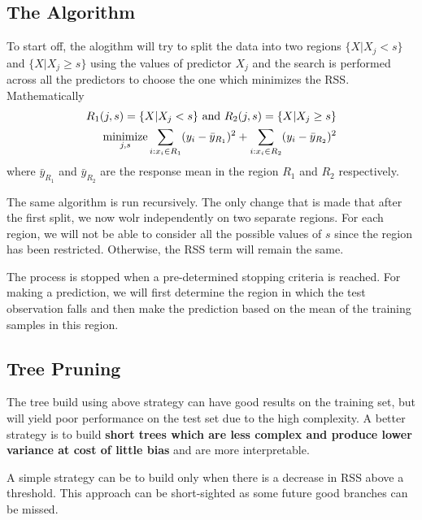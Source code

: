 \documentclass[../statistical_learning_notes.tex]{subfiles}
\begin{document}
    \subsection{The Algorithm}
    To start off, the alogithm will try to split the data into two regions $\{X|X_{j} < s\}$ and $\{X|X_{j} \geq s\}$ using the values of predictor $X_{j}$ and the search is performed across all the predictors to choose the one which minimizes the RSS. Mathematically
    \begin{align*}
        R_{1}(j,s) = \{X|X_{j} < s\} \text{ and } R_{2}(j,s) = \{X|X_{j} \geq s\}\\
        \operatorname*{minimize}_{j, s} \sum_{i:x_{i} \in R_{1}} (y_{i} - \bar{y}_{R_{1}})^{2} + \sum_{i:x_{i} \in R_{2}} (y_{i} - \bar{y}_{R_{2}})^{2}
    \end{align*}
    where $\bar{y}_{R_{1}}$ and $\bar{y}_{R_{2}}$ are the response mean in the region $R_{1}$ and $R_{2}$ respectively.\newline

    The same algorithm is run recursively. The only change that is made that after the first split, we now wolr independently on two separate regions. For each region, we will not be able to consider all the possible values of $s$ since the region has been restricted. Otherwise, the RSS term will remain the same.\newline

    The process is stopped when a pre-determined stopping criteria is reached. For making a prediction, we will first determine the region in which the test observation falls and then make the prediction based on the mean of the training samples in this region.


    \subsection{Tree Pruning}
    The tree build using above strategy can have good results on the training set, but will yield poor performance on the test set due to the high complexity. A better strategy is to build \textbf{short trees which are less complex and produce lower variance at cost of little bias} and are more interpretable.\newline

    A simple strategy can be to build only when there is a decrease in RSS above a threshold. This approach can be short-sighted as some future good branches can be missed.\newline
\end{document}
